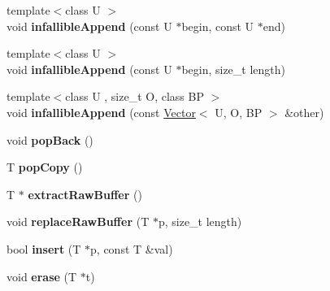 \begin{DoxyCompactItemize}
\item 
\hypertarget{classjs_1_1_vector_addb38bd89f51ab343a76c0e9d48f0a47}{{\footnotesize template$<$class U $>$ }\\void {\bfseries infallible\-Append} (const U $\ast$begin, const U $\ast$end)}\label{classjs_1_1_vector_addb38bd89f51ab343a76c0e9d48f0a47}

\item 
\hypertarget{classjs_1_1_vector_a3607576bca45b162cf94adcdacea7cf0}{{\footnotesize template$<$class U $>$ }\\void {\bfseries infallible\-Append} (const U $\ast$begin, size\-\_\-t length)}\label{classjs_1_1_vector_a3607576bca45b162cf94adcdacea7cf0}

\item 
\hypertarget{classjs_1_1_vector_a4468968b2424fef8bfd860528b690ae8}{{\footnotesize template$<$class U , size\-\_\-t O, class B\-P $>$ }\\void {\bfseries infallible\-Append} (const \hyperlink{classjs_1_1_vector}{Vector}$<$ U, O, B\-P $>$ \&other)}\label{classjs_1_1_vector_a4468968b2424fef8bfd860528b690ae8}

\item 
\hypertarget{classjs_1_1_vector_a34c89890e921ccd20a7c5ba58556e580}{void {\bfseries pop\-Back} ()}\label{classjs_1_1_vector_a34c89890e921ccd20a7c5ba58556e580}

\item 
\hypertarget{classjs_1_1_vector_abe0f8b9e0d6d0a86790f6834f0b66259}{T {\bfseries pop\-Copy} ()}\label{classjs_1_1_vector_abe0f8b9e0d6d0a86790f6834f0b66259}

\item 
\hypertarget{classjs_1_1_vector_a43b05a770cc6c0794513063ff5a9a087}{T $\ast$ {\bfseries extract\-Raw\-Buffer} ()}\label{classjs_1_1_vector_a43b05a770cc6c0794513063ff5a9a087}

\item 
\hypertarget{classjs_1_1_vector_a0d4e951feea0dc4dde345abb2c2b52a5}{void {\bfseries replace\-Raw\-Buffer} (T $\ast$p, size\-\_\-t length)}\label{classjs_1_1_vector_a0d4e951feea0dc4dde345abb2c2b52a5}

\item 
\hypertarget{classjs_1_1_vector_a3e2148d2700329c1968faba364b1dd7a}{bool {\bfseries insert} (T $\ast$p, const T \&val)}\label{classjs_1_1_vector_a3e2148d2700329c1968faba364b1dd7a}

\item 
\hypertarget{classjs_1_1_vector_a4046dc8b3efa90d7663c270ca8b406d1}{void {\bfseries erase} (T $\ast$t)}\label{classjs_1_1_vector_a4046dc8b3efa90d7663c270ca8b406d1}


\end{DoxyCompactItemize}
